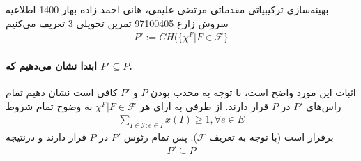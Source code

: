 \documentclass[a4paper,12pt]{article}
\begin{document}
\handout
{بهینه‌سازی ترکیبیاتی مقدماتی}
{مرتضی علیمی، هانی احمد زاده}
{بهار 1400}
{اطلاعیه}
{سروش زارع}
{97100405}
 {تمرین تحویلی 3}
 تعریف می‌کنیم
\begin{align*}
P' := CH(\{\chi^F | F \in \mathcal{F} \}
\end{align*}

\paragraph{ابتدا نشان می‌دهیم که $P' \subseteq P$.}
اثبات این مورد واضح است، با توجه به محدب بودن $P$ و $P'$ کافی است نشان دهیم تمام راس‌های $P'$ در $P$ قرار دارند. از طرفی به ازای هر 
$\chi^F | F \in \mathcal{F}$
 به وضوح تمام شروط 
\begin{align*}
	\sum_{I \in \mathcal{I} : e \in I} x(I) \geq 1, \forall e \in E
\end{align*}
برقرار است (با توجه به تعریف $\mathcal{F}$). پس تمام رئوس $P'$ در $P$ قرار دارند و درنتیجه
\begin{align}
	P' \subseteq P
\end{align}
\end{document}
